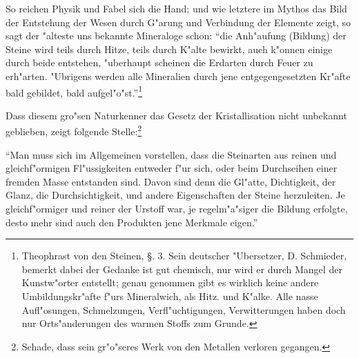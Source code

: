 \documentclass[a4paper, 11pt, oneside, polutonikogreek, german]{article}
\begin{document}
So reichen Physik und Fabel sich die Hand; und wie letztere im Mythos das Bild der Entstehung der Wesen durch G"arung und Verbindung der Elemente zeigt, so sagt der "alteste uns bekannte Mineraloge schon: "`die Anh"aufung (Bildung) der Steine wird teils durch Hitze, teils durch K"alte bewirkt, auch k"onnen einige durch beide entstehen, "uberhaupt scheinen die Erdarten durch Feuer zu erh"arten. "Ubrigens werden alle Mineralien durch jene entgegengesetzten Kr"afte bald gebildet, bald aufgel"o"st."'\footnote{Theophrast von den Steinen, §. 3. Sein deutscher "Ubersetzer, D. Schmieder, bemerkt dabei der Gedanke ist gut chemisch, nur wird er durch Mangel der Kunstw"orter entstellt; genau genommen gibt es wirklich keine andere Umbildungskr"afte f"urs Mineralwich, als Hitz. und K"alke. Alle nasse Aufl"osungen, Schmelzungen, Verfl"uchtigungen, Verwitterungen haben doch nur Orts"anderungen des warmen Stoffs zum Grunde.}

Dass diesem gro"sen Naturkenner das Gesetz der Kristallisation nicht unbekannt geblieben, zeigt folgende Stelle:\footnote{Schade, dass sein gr"o"seres Werk von den Metallen verloren gegangen.}

"`Man muss sich im Allgemeinen vorstellen, dass die Steinarten aus reinen und gleichf"ormigen Fl"ussigkeiten entweder f"ur sich, oder beim Durchseihen einer fremden Masse entstanden sind. Davon sind denn die Gl"atte, Dichtigkeit, der Glanz, die Durchsichtigkeit, und andere Eigenschaften der Steine herzuleiten. Je gleichf"ormiger und reiner der Urstoff war, je regelm"a"siger die Bildung erfolgte, desto mehr sind auch den Produkten jene Merkmale eigen."'
\end{document}
